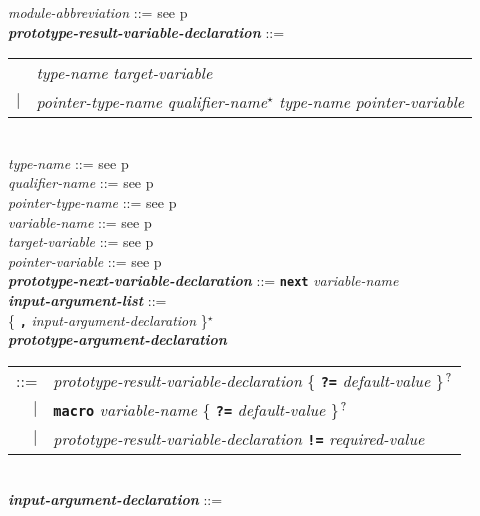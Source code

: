 \documentclass[12pt]{article}
\newcommand{\TT}[1]{{\tt \bfseries #1}}
\newcommand{\STAR}{{\Large $^\star$}}
\newcommand{\QMARK}{{$^{\,\mbox{\footnotesize ?}}$}}
\newcommand{\ttkey}[1]{{\tt \bfseries #1}}
\newcommand{\emkey}[1]{{\em \bfseries #1}}
\newcommand{\pagref}[1]{p\pageref{#1}}
\newenvironment{indpar}[1][0.3in]%
	{\begin{list}{}%
		     {\setlength{\itemsep}{0in}%
		      \setlength{\topsep}{0in}%
		      \setlength{\parsep}{1ex}%
		      \setlength{\labelwidth}{#1}%
		      \setlength{\leftmargin}{#1}%
		      \addtolength{\leftmargin}{\labelsep}}%
	 \item}%
	{\end{list}}
\begin{document}
\begin{indpar}[0.1in]
{\em module-abbreviation} ::= see \pagref{MODULE-ABBREVIATION}
\\[0.5ex]
\emkey{prototype-result-variable-declaration}%
    \label{PROTOTYPE-RESULT-VARIABLE-DECLARATION} ::= \\
\hspace*{0.5in}\begin{tabular}{rl}
	    & {\em type-name} {\em target-variable} \\
	$|$ & {\em pointer-type-name} {\em qualifier-name}\STAR{}
	      {\em type-name} {\em pointer-variable}
	\end{tabular}
\\[0.5ex]
{\em type-name} ::= see \pagref{TYPE-NAME}
\\[0.5ex]
{\em qualifier-name} ::= see \pagref{QUALIFIER-NAME}
\\[0.5ex]
{\em pointer-type-name} ::= see \pagref{POINTER-TYPE-NAME}
\\[0.5ex]
{\em variable-name} ::= see \pagref{VARIABLE-NAME}
\\[0.5ex]
{\em target-variable} ::= see \pagref{TARGET-VARIABLE}
\\[0.5ex]
{\em pointer-variable} ::= see \pagref{POINTER-VARIABLE}
\\[0.5ex]
\emkey{prototype-next-variable-declaration}%
    \label{PROTOTYPE-NEXT-VARIABLE-DECLARATION}
      ::= \ttkey{next} {\em variable-name}
\\[0.5ex]
\emkey{input-argument-list}\label{INPUT-ARGUMENT-LIST} ::= \\
\hspace*{0.5in}{\em prototype-result-variable-declaration}
                 \{ \TT{,} {\em input-argument-declaration} \}\STAR{}
\\[0.5ex]
\emkey{prototype-argument-declaration}\label{PROTOTYPE-ARGUMENT-DECLARATION} \\
\hspace*{0.5in}\begin{tabular}[t]{@{}rl@{}}
    ::= & {\em prototype-result-variable-declaration}
          \{ \TT{?=} {\em default-value} \}\QMARK{} \\
    $|$ & \TT{macro} {\em variable-name}
          \{ \TT{?=} {\em default-value} \}\QMARK{} \\
    $|$ & {\em prototype-result-variable-declaration}
          \TT{!=} {\em required-value} \\
    \end{tabular}
\\[0.5ex]
\emkey{input-argument-declaration}\label{INPUT-ARGUMENT-DECLARATION} ::= \\

\end{indpar}
\end{document}
